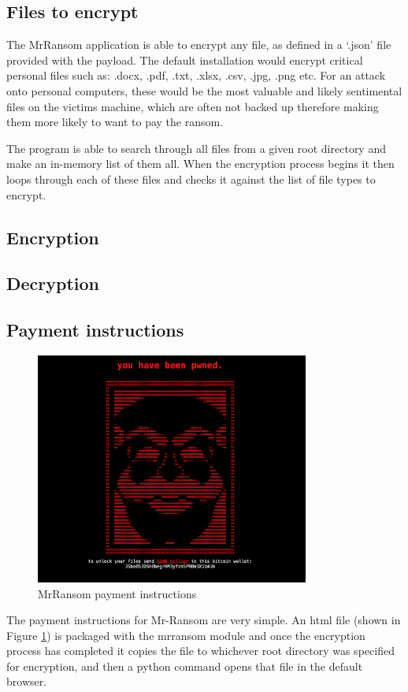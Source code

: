 \documentclass[12pt]{article}
\begin{document}
  \subsection{Files to encrypt}
    The MrRansom application is able to encrypt any file, as defined in a ‘.json’ file provided with the payload. The default installation would encrypt critical personal files such as: .docx, .pdf, .txt, .xlsx, .csv, .jpg, .png etc. For an attack onto personal computers, these would be the most valuable and likely sentimental files on the victims machine, which are often not backed up therefore making them more likely to want to pay the ransom.

    The program is able to search through all files from a given root directory and make an in-memory list of them all. When the encryption process begins it then loops through each of these files and checks it against the list of file types to encrypt.

  \subsection{Encryption}

  \subsection{Decryption}

  \subsection{Payment instructions}
    \begin{figure}[ht]
      \centering
       \includegraphics[width=9cm]{payment}
       \caption{MrRansom payment instructions}
       \label{fig:mrransom-payment-instructions}
     \end{figure}

    The payment instructions for Mr-Ransom are very simple. An html file (shown in Figure  \ref{fig:mrransom-payment-instructions}) is packaged with the mrransom module and once the encryption process has completed it copies the file to whichever root directory was specified for encryption, and then a python command opens that file in the default browser.

\newpage



\end{document}
